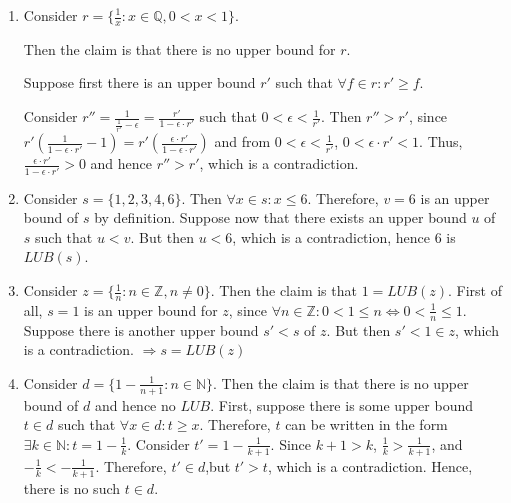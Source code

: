\documentclass[12pt]{article}
\def\Q{\mathbb{Q}}
\def\ra{\Rightarrow}
\def\equ{\Leftrightarrow}
\def\v{\\ \vspace{0.1in}}
\def\*{\cdot}
\def\N{\mathbb{N}}
\def\Z{\mathbb{Z}}
\theoremstyle{definition}
\theoremstyle{remark}
\begin{document}
\begin{enumerate}
\item Consider $r=\{\frac{1}{x}: x\in\Q, 0<x<1\}$. \v

  Then the claim is that there is no upper bound for $r$.\v

  Suppose first there is an upper bound $r'$ such that $\forall f\in r: r'\geq f.$\v

  Consider
  $r''=\frac{1}{\frac{1}{r'}-\epsilon}=\frac{r'}{1-\epsilon\* r'}$
  such that $0 < \epsilon < \frac{1}{r'}$. Then $r''>r'$, since
  $r'(\frac{1}{1-\epsilon\* r'}-1)=r'(\frac{\epsilon\*
    r'}{1-\epsilon\* r'})$ and from $0 < \epsilon < \frac{1}{r'}$,
  $0<\epsilon\* r'<1$. Thus, $\frac{\epsilon\*
    r'}{1-\epsilon\* r'}>0$ and hence $r''>r'$, which is a contradiction.
\item Consider $s=\{1,2,3,4,6\}$. Then $\forall x \in s: x\leq
  6$. Therefore, $v=6$ is an upper bound of $s$ by definition. Suppose
  now that there exists an upper bound $u$ of $s$ such that $u<v$. But
  then $u<6$, which is a contradiction, hence $6$ is $LUB(s)$.
\item Consider $z=\{\frac{1}{n}: n\in\Z, n\neq0\}$. Then the claim is
  that $1=LUB(z)$. First of all, $s=1$ is an upper bound for $z$,
  since $\forall n\in\Z: 0<1\leq n \equ 0<\frac{1}{n}\leq 1$. Suppose
  there is another upper bound $s'<s$ of $z$. But then $s'<1 \in z$,
  which is a contradiction. $\ra s=LUB(z)$
\item Consider $d=\{1-\frac{1}{n+1}: n\in\N\}$. Then the claim is that
  there is no upper bound of $d$ and hence no $LUB$. First, suppose
  there is some upper bound $t\in d$ such that
  $\forall x\in d: t\geq x$. Therefore, $t$ can be written in the form
  $\exists k\in\N: t=1-\frac{1}{k}$. Consider
  $t'=1-\frac{1}{k+1}$. Since $k+1>k$, $\frac{1}{k}>\frac{1}{k+1}$,
  and $-\frac{1}{k}< -\frac{1}{k+1}$. Therefore, $t'\in d$,but $t'>t$,
  which is a contradiction. Hence, there is no such $t \in d$.
\end{enumerate}
\end{document}
